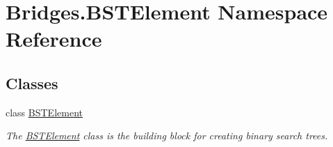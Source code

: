 \hypertarget{namespace_bridges_1_1_b_s_t_element}{}\section{Bridges.\+B\+S\+T\+Element Namespace Reference}
\label{namespace_bridges_1_1_b_s_t_element}
\subsection*{Classes}
\begin{DoxyCompactItemize}
\item 
class \hyperlink{class_bridges_1_1_b_s_t_element_1_1_b_s_t_element}{B\+S\+T\+Element}
\begin{DoxyCompactList}\small\item\em The \hyperlink{class_bridges_1_1_b_s_t_element_1_1_b_s_t_element}{B\+S\+T\+Element} class is the building block for creating binary search trees. \end{DoxyCompactList}\end{DoxyCompactItemize}
